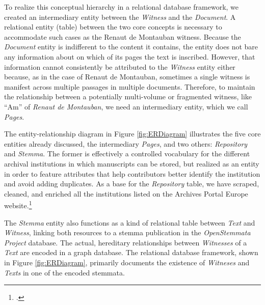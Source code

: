 To realize this conceptual hierarchy in a relational database framework, we created an intermediary entity between the \textit{Witness} and the \textit{Document}. A relational entity (table) between the two core concepts is necessary to accommodate such cases as the Renaut de Montauban witness. Because the \textit{Document} entity is indifferent to the content it contains, the entity does not bare any information about on which of its pages the text is inscribed. However, that information cannot consistently be attributed to the \textit{Witness} entity either because, as in the case of Renaut de Montauban, sometimes a single witness is manifest across multiple passages in multiple documents. Therefore, to maintain the relationship between a potentially multi-volume or fragmented witness, like ``Am'' of \textit{Renaut de Montauban}, we need an intermediary entity, which we call \textit{Pages}.

The entity-relationship diagram in Figure \ref{fig:ERDiagram} illustrates the five core entities already discussed, the intermediary \textit{Pages}, and two others: \textit{Repository} and \textit{Stemma}. The former is effectively a controlled vocabulary for the different archival institutions in which manuscripts can be stored, but realized as an entity in order to feature attributes that help contributors better identify the institution and avoid adding duplicates. As a base for the \textit{Repository} table, we have scraped, cleaned, and enriched all the institutions listed on the Archives Portal Europe website.\footcite[][]{ArchivesPortal}

The \textit{Stemma} entity also functions as a kind of relational table between \textit{Text} and \textit{Witness}, linking both resources to a stemma publication in the \textit{OpenStemmata Project} database. The actual, hereditary relationships between \textit{Witnesses} of a \textit{Text} are encoded in a graph database. The relational database framework, shown in Figure \ref{fig:ERDiagram}, primarily documents the existence of \textit{Witneses} and \textit{Texts} in one of the encoded stemmata.

